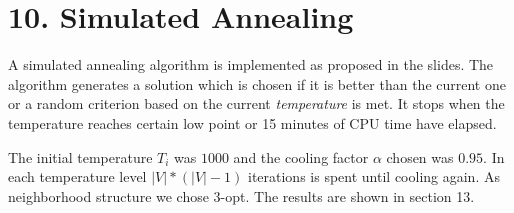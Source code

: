 \section*{10. Simulated Annealing}
A simulated annealing algorithm  is implemented as proposed in the slides. The algorithm generates a solution which is chosen if it is better than the current one or a random criterion based on the current \textit{temperature} is met. It stops when the temperature reaches certain low point or 15 minutes of CPU time have elapsed.

The initial temperature $ T_i $ was $ 1000 $ and the cooling factor $ \alpha $ chosen was $ 0.95 $. In each temperature level $ |V|*(|V|-1) $ iterations is spent until cooling again. As neighborhood structure we chose 3-opt. The results are shown in section 13.

